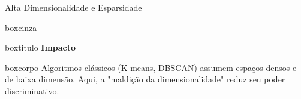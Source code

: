 \documentclass[aspectratio=43]{beamer}
\begin{document}
\begin{frame}[t]{Alta Dimensionalidade e Esparsidade}
\begin{center}
\begin{beamercolorbox}[wd=0.80\paperwidth, sep=0pt]{boxcinza}
  \begin{beamercolorbox}[wd=0.80\paperwidth, ht=0.5cm, dp=0.1cm, leftskip=0.25cm]{boxtitulo}
    {\color{uelgreen}\textbf{Impacto}}
  \end{beamercolorbox}
  \begin{beamercolorbox}[wd=0.80\paperwidth, sep=0.25cm]{boxcorpo}
    \scriptsize
    Algoritmos clássicos (K-means, DBSCAN) assumem espaços densos e de baixa dimensão. Aqui, a "maldição da dimensionalidade" reduz seu poder discriminativo.
  \end{beamercolorbox}
\end{beamercolorbox}
\end{center}

\end{frame}
\end{document}
